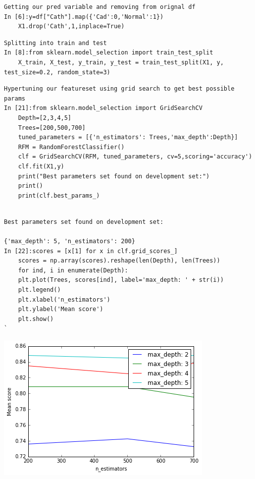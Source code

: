 \documentclass[sigconf]{acmart}
\begin{document}
\begin{lstlisting}
Getting our pred variable and removing from orignal df
In [6]:y=df["Cath"].map({'Cad':0,'Normal':1})
    X1.drop('Cath',1,inplace=True)
\end{lstlisting}
\begin{lstlisting}
Splitting into train and test
In [8]:from sklearn.model_selection import train_test_split
    X_train, X_test, y_train, y_test = train_test_split(X1, y, test_size=0.2, random_state=3)
\end{lstlisting}
\begin{lstlisting}
Hypertuning our featureset using grid search to get best possible params
In [21]:from sklearn.model_selection import GridSearchCV
    Depth=[2,3,4,5]
    Trees=[200,500,700]
    tuned_parameters = [{'n_estimators': Trees,'max_depth':Depth}]              
    RFM = RandomForestClassifier()
    clf = GridSearchCV(RFM, tuned_parameters, cv=5,scoring='accuracy')
    clf.fit(X1,y)
    print("Best parameters set found on development set:")
    print()
    print(clf.best_params_)
\end{lstlisting}
\begin{lstlisting}

Best parameters set found on development set:

{'max_depth': 5, 'n_estimators': 200}
In [22]:scores = [x[1] for x in clf.grid_scores_]
    scores = np.array(scores).reshape(len(Depth), len(Trees))
    for ind, i in enumerate(Depth):
    plt.plot(Trees, scores[ind], label='max_depth: ' + str(i))
    plt.legend()
    plt.xlabel('n_estimators')
    plt.ylabel('Mean score')
    plt.show()
`
\end{lstlisting}
\includegraphics[width=0.95\columnwidth]{project/output_15_1.png}
\end{document}
